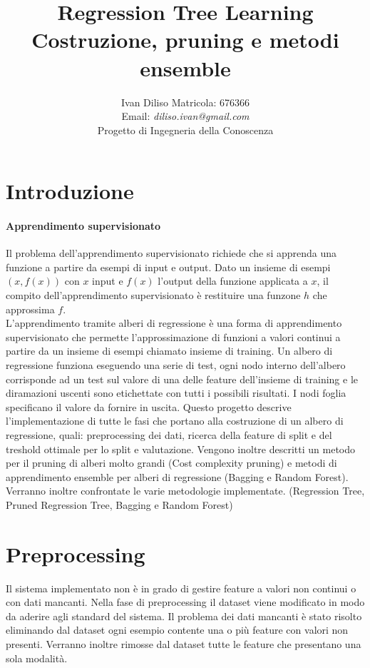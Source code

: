 \documentclass{article}
\title{Regression Tree Learning \\ 
    \large Costruzione, pruning e metodi ensemble}
\author{Ivan Diliso Matricola: 676366 \\
Email: \textit{diliso.ivan@gmail.com} \\
    Progetto di Ingegneria della Conoscenza}
\date{}
\begin{document}
    \maketitle

    \newpage

    \tableofcontents{}

    \newpage

    \section{Introduzione}
    \paragraph{Apprendimento supervisionato}
    Il problema dell'apprendimento supervisionato richiede
    che si apprenda una funzione a partire da esempi di input e output.
    Dato un insieme di esempi \((x, f(x))\) con \(x\) input e \(f(x)\)
    l'output della funzione applicata a \(x\), il compito dell'apprendimento
    supervisionato è restituire una funzone \(h\) che approssima \(f\). \\

    L'apprendimento tramite alberi di regressione è una forma di apprendimento
    supervisionato che permette l'approssimazione di funzioni a valori continui
    a partire da un insieme di esempi chiamato insieme di training. Un albero di
    regressione funziona eseguendo una serie di test, ogni nodo interno dell'albero
    corrisponde ad un test sul valore di una delle feature dell'insieme di training
    e le diramazioni uscenti sono etichettate con tutti i possibili risultati. I nodi 
    foglia specificano il valore da fornire in uscita. 
    Questo progetto descrive l'implementazione di tutte le fasi che portano alla costruzione di un albero 
    di regressione, quali: preprocessing dei dati, ricerca della feature di split e del
    treshold ottimale per lo split e valutazione.
    Vengono inoltre descritti un metodo per il pruning di alberi molto grandi (Cost 
    complexity pruning) e metodi di apprendimento ensemble per alberi di regressione
    (Bagging e Random Forest). Verranno inoltre confrontate le varie metodologie 
    implementate.
    (Regression Tree, Pruned Regression Tree, Bagging e Random Forest)


    \section{Preprocessing}
    Il sistema implementato non è in grado di gestire feature a valori non continui 
    o con dati mancanti. Nella fase di preprocessing il dataset viene modificato in 
    modo da aderire agli standard del sistema. Il problema dei dati mancanti è stato
    risolto eliminando dal dataset ogni esempio contente una o più feature con valori
    non presenti. Verranno inoltre rimosse dal dataset tutte le feature che presentano
    una sola modalità. 
\end{document}
